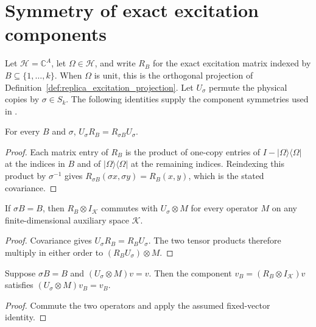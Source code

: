 \section{Symmetry of exact excitation components}
\label{sec:replica_excitation_symmetry}

Let $\mathcal H=\mathbb C^A$, let $\Omega\in\mathcal H$, and write $R_B$
for the exact excitation matrix indexed by $B\subseteq\{1,\ldots,k\}$.
When $\Omega$ is unit, this is the orthogonal projection of
Definition~\ref{def:replica_excitation_projection}.
Let $U_\sigma$ permute the physical copies by $\sigma\in S_k$.
The following identities supply the component symmetries used in
\cite[Section~7]{OpenAI2026AreaLaw}.

\begin{theorem}
\label{thm:replica_excitation_covariance}
\leanok
{}
For every $B$ and $\sigma$, $U_\sigma R_B=R_{\sigma B}U_\sigma$.
\end{theorem}
\begin{proof}
\leanok
Each matrix entry of $R_B$ is the product of one-copy entries of
$I-|\Omega\rangle\langle\Omega|$ at the indices in $B$ and of
$|\Omega\rangle\langle\Omega|$ at the remaining indices.
Reindexing this product by $\sigma^{-1}$ gives
$R_{\sigma B}(\sigma x,\sigma y)=R_B(x,y)$, which is the stated covariance.
\end{proof}

\begin{theorem}
\label{thm:replica_excitation_auxiliary_commute}
\leanok
{}
If $\sigma B=B$, then $R_B\otimes I_{\mathcal K}$ commutes with
$U_\sigma\otimes M$ for every operator $M$ on any finite-dimensional
auxiliary space $\mathcal K$.
\end{theorem}
\begin{proof}
\leanok
{}
Covariance gives $U_\sigma R_B=R_BU_\sigma$. The two tensor products
therefore multiply in either order to $(R_BU_\sigma)\otimes M$.
\end{proof}

\begin{theorem}
\label{thm:replica_excitation_preserves_fixed}
\leanok
{}
Suppose $\sigma B=B$ and $(U_\sigma\otimes M)v=v$.
Then the component $v_B=(R_B\otimes I_{\mathcal K})v$ satisfies
$(U_\sigma\otimes M)v_B=v_B$.
\end{theorem}
\begin{proof}
\leanok
{}
Commute the two operators and apply the assumed fixed-vector identity.
\end{proof}

